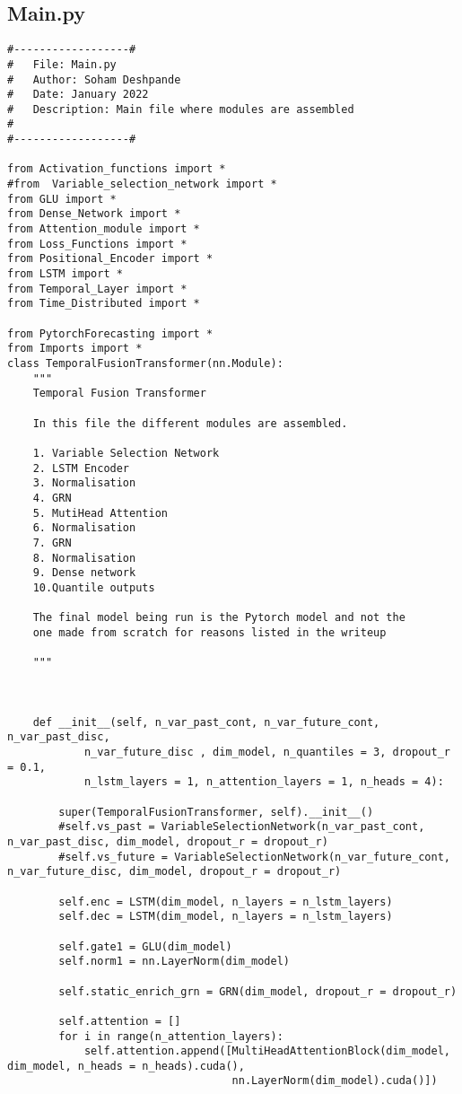 \documentclass{article}
\begin{document}
\subsection{Main.py}
\begin{lstlisting}
#------------------#
#   File: Main.py
#   Author: Soham Deshpande
#   Date: January 2022
#   Description: Main file where modules are assembled
#
#------------------#

from Activation_functions import *
#from  Variable_selection_network import *
from GLU import *
from Dense_Network import *
from Attention_module import *
from Loss_Functions import *
from Positional_Encoder import *
from LSTM import *
from Temporal_Layer import *
from Time_Distributed import *

from PytorchForecasting import *
from Imports import *
class TemporalFusionTransformer(nn.Module):
    """
    Temporal Fusion Transformer

    In this file the different modules are assembled.

    1. Variable Selection Network
    2. LSTM Encoder
    3. Normalisation
    4. GRN
    5. MutiHead Attention
    6. Normalisation
    7. GRN
    8. Normalisation
    9. Dense network
    10.Quantile outputs

    The final model being run is the Pytorch model and not the
    one made from scratch for reasons listed in the writeup

    """



    def __init__(self, n_var_past_cont, n_var_future_cont, n_var_past_disc,
            n_var_future_disc , dim_model, n_quantiles = 3, dropout_r = 0.1,
            n_lstm_layers = 1, n_attention_layers = 1, n_heads = 4):

        super(TemporalFusionTransformer, self).__init__()
        #self.vs_past = VariableSelectionNetwork(n_var_past_cont, n_var_past_disc, dim_model, dropout_r = dropout_r)
        #self.vs_future = VariableSelectionNetwork(n_var_future_cont, n_var_future_disc, dim_model, dropout_r = dropout_r)

        self.enc = LSTM(dim_model, n_layers = n_lstm_layers)
        self.dec = LSTM(dim_model, n_layers = n_lstm_layers)

        self.gate1 = GLU(dim_model)
        self.norm1 = nn.LayerNorm(dim_model)

        self.static_enrich_grn = GRN(dim_model, dropout_r = dropout_r)

        self.attention = []
        for i in range(n_attention_layers):
            self.attention.append([MultiHeadAttentionBlock(dim_model, dim_model, n_heads = n_heads).cuda(),
                                   nn.LayerNorm(dim_model).cuda()])


\end{lstlisting}
\end{document}
